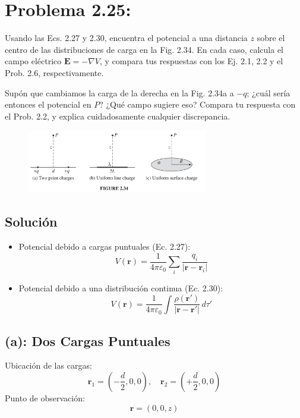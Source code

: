 \documentclass[12pt,letterpaper]{article}
\begin{document}



 \section*{Problema 2.25:} Usando las Ecs. 2.27 y 2.30, encuentra el potencial a una distancia $z$ sobre el centro de las distribuciones de carga en la Fig. 2.34. En cada caso, calcula el campo eléctrico $\mathbf{E} = -\nabla V$, y compara tus respuestas con los Ej. 2.1, 2.2 y el Prob. 2.6, respectivamente. 

Supón que cambiamos la carga de la derecha en la Fig. 2.34a a $-q$; ¿cuál sería entonces el potencial en $P$? ¿Qué campo sugiere eso? Compara tu respuesta con el Prob. 2.2, y explica cuidadosamente cualquier discrepancia.


\begin{figure}[h] 
    \centering
    \includegraphics[width=0.7\textwidth]{imagenes/problema_25.png}
    \captionsetup{labelformat=empty}
    \label{Esquema}
\end{figure}

\subsection*{Solución}
\begin{itemize}
    \item Potencial debido a cargas puntuales (Ec. 2.27):
    \[
        V(\mathbf{r}) = \frac{1}{4\pi\varepsilon_0} \sum_i \frac{q_i}{|\mathbf{r} - \mathbf{r}_i|}
    \]
    \item Potencial debido a una distribución continua (Ec. 2.30):
    \[
        V(\mathbf{r}) = \frac{1}{4\pi\varepsilon_0} \int \frac{\rho(\mathbf{r'})}{|\mathbf{r} - \mathbf{r'}|} \, d\tau'
    \]
\end{itemize}

\subsection*{(a): Dos Cargas Puntuales}

Ubicación de las cargas:
\[
\mathbf{r}_1 = \left(-\frac{d}{2}, 0, 0\right), \quad \mathbf{r}_2 = \left(+\frac{d}{2}, 0, 0\right)
\]
Punto de observación:
\[
\mathbf{r} = (0, 0, z)
\]
\end{document}

